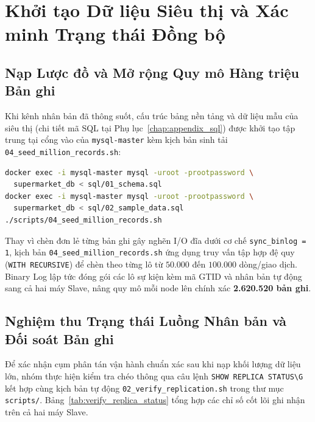 \documentclass[12pt,a4paper]{report}
\begin{document}
\section{Khởi tạo Dữ liệu Siêu thị và Xác minh Trạng thái Đồng bộ}

\subsection{Nạp Lược đồ và Mở rộng Quy mô Hàng triệu Bản ghi}
Khi kênh nhân bản đã thông suốt, cấu trúc bảng nền tảng và dữ liệu mẫu của siêu thị (chi tiết mã SQL tại Phụ lục~\ref{chap:appendix_sql}) được khởi tạo tập trung tại cổng vào của \texttt{mysql-master} kèm kịch bản sinh tải \texttt{04\_seed\_million\_records.sh}:

\begin{lstlisting}[language=bash, caption={Nạp lược đồ gốc và sinh 2,62 triệu bản ghi trên Master}]
docker exec -i mysql-master mysql -uroot -prootpassword \
  supermarket_db < sql/01_schema.sql
docker exec -i mysql-master mysql -uroot -prootpassword \
  supermarket_db < sql/02_sample_data.sql
./scripts/04_seed_million_records.sh
\end{lstlisting}

Thay vì chèn đơn lẻ từng bản ghi gây nghẽn I/O đĩa dưới cơ chế \texttt{sync\_binlog = 1}, kịch bản \texttt{04\_seed\_million\_records.sh} ứng dụng truy vấn tập hợp đệ quy (\texttt{WITH RECURSIVE}) để chèn theo từng lô từ $50.000$ đến $100.000$ dòng/giao dịch. Binary Log lập tức đóng gói các lô sự kiện kèm mã GTID và nhân bản tự động sang cả hai máy Slave, nâng quy mô mỗi node lên chính xác \textbf{2.620.520 bản ghi}.

\subsection{Nghiệm thu Trạng thái Luồng Nhân bản và Đối soát Bản ghi}
Để xác nhận cụm phân tán vận hành chuẩn xác sau khi nạp khối lượng dữ liệu lớn, nhóm thực hiện kiểm tra chéo thông qua câu lệnh \texttt{SHOW REPLICA STATUS\textbackslash G} kết hợp cùng kịch bản tự động \texttt{02\_verify\_replication.sh} trong thư mục \texttt{scripts/}. Bảng~\ref{tab:verify_replica_status} tổng hợp các chỉ số cốt lõi ghi nhận trên cả hai máy Slave.
\end{document}
